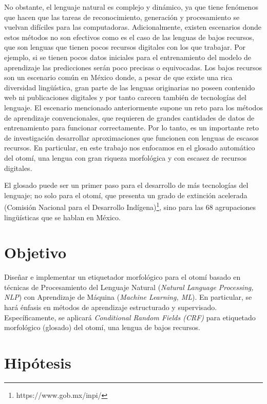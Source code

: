\documentclass[letterpaper,12pt,oneside]{book}
\theoremstyle{definition}
\begin{document}
No obstante, el lenguaje natural es complejo y dinámico, ya que tiene fenómenos que hacen que las tareas de reconocimiento, generación y procesamiento se vuelvan difíciles para las computadoras. Adicionalmente, existen escenarios donde estos métodos no son efectivos como es el caso de las lenguas de bajos recursos, que son lenguas que tienen pocos recursos digitales con los que trabajar. Por ejemplo, si se tienen pocos datos iniciales para el entrenamiento del modelo de aprendizaje las predicciones serán poco precisas o equivocadas. Los bajos recursos son un escenario común en México donde, a pesar de que existe una rica diversidad lingüística, gran parte de las lenguas originarias no poseen contenido web ni publicaciones digitales y por tanto carecen también de tecnologías del lenguaje.  El escenario mencionado anteriormente supone un reto para los métodos de aprendizaje convencionales, que requieren de grandes cantidades de datos de entrenamiento para funcionar correctamente. Por lo tanto, es un importante reto de investigación desarrollar aproximaciones que funcionen con lenguas de escasos recursos. En particular, en este trabajo nos enfocamos en el glosado automático del otomí, una lengua con gran riqueza morfológica y con escasez de recursos digitales.

El glosado puede ser un primer paso para el desarrollo de más tecnologías del lenguaje; no solo para el otomí, que presenta un grado de extinción acelerada (Comisión Nacional para el Desarrollo Indígena)\footnote{https://www.gob.mx/inpi/}, sino para las 68 agrupaciones lingüísticas que se hablan en México.

\section{Objetivo}

Diseñar e implementar un etiquetador morfológico para el otomí basado en técnicas de Procesamiento del Lenguaje Natural (\textit{Natural Language Processing, NLP}) con Aprendizaje de Máquina (\textit{Machine Learning, ML}). En particular, se hará énfasis en métodos de aprendizaje estructurado y supervisado. Específicamente, se aplicará \textit{Conditional Random Fields (CRF)} para etiquetado morfológico (glosado) del otomí, una lengua de bajos recursos.

\section{Hipótesis}
\end{document}
